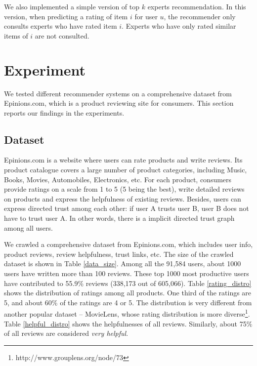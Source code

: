 \documentclass[12pt]{article}
\begin{document}
We also implemented a simple version of top $k$ experts recommendation. In this version, when predicting a rating of item $i$ for user $u$, the recommender only consults experts who have rated item $i$. Experts who have only rated similar items of $i$ are not consulted.
 



\section{Experiment}
We tested different recommender systems on a comprehensive dataset from Epinions.com, which is a product reviewing site for consumers. This section reports our findings in the experiments.  
\subsection{Dataset}
Epinions.com is a website where users can rate products and write reviews. Its product catalogue covers a large number of product categories, including Music, Books, Movies, Automobiles, Electronics, etc. For each product, consumers provide ratings on a scale from 1 to 5 (5 being the best), write detailed reviews on products and express the helpfulness of existing reviews. Besides, users can express directed trust among each other: if user A trusts user B, user B does not have to trust user A. In other words, there is a implicit directed trust graph among all users. 

We crawled a comprehensive dataset from Epinions.com, which includes user info, product reviews, review helpfulness, trust links, etc. The size of the crawled dataset is shown in Table \ref{data_size}. Among all the 91,584 users, about 1000 users have written more than 100 reviews. These top 1000 most productive users have contributed to 55.9\% reviews (338,173 out of 605,066).  Table \ref{rating_distro} shows the distribution of ratings among all products. One third of the ratings are 5, and about 60\% of the ratings are 4 or 5. The distribution is very different from another popular dataset -- MovieLens, whose rating distribution is more diverse\footnote[1]{http://www.grouplens.org/node/73}. Table \ref{helpful_distro} shows the helpfulnesses of all reviews. Similarly, about 75\% of all reviews are considered \emph{very helpful}. 
\end{document}
